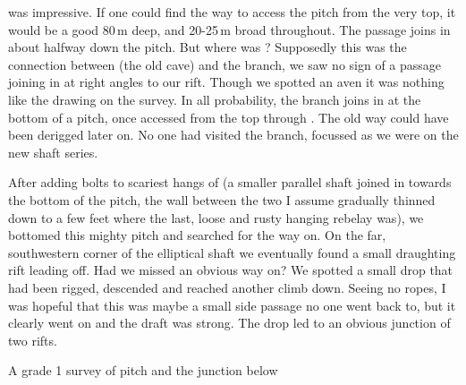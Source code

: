  was impressive. If one could find the way to access the pitch from the very top, it would be a good 80\,m deep, and 20-25\,m broad throughout. The passage joins in about halfway down the pitch. But where was ? Supposedly this was the connection between  (the old cave) and the  branch, we saw no sign of a passage joining in at right angles to our rift. Though we spotted an aven it was nothing like the drawing on the survey. In all probability, the  branch joins in at the bottom of a pitch, once accessed from the top through . The old way could have been derigged later on. No one had visited the  branch, focussed as we were on the new shaft series. 

After adding bolts to scariest hangs of  (a smaller parallel shaft joined in towards the bottom of the pitch, the wall between the two I assume gradually thinned down to a few feet where the last, loose and rusty hanging rebelay was), we bottomed this mighty pitch and searched for the way on. On the far, southwestern corner of the elliptical shaft  we eventually found a small draughting rift leading off. Had we missed an obvious way on? We spotted a small drop that had been rigged, descended and reached another climb down. Seeing no ropes, I was hopeful that this was maybe a small side passage no one went back to, but it clearly went on and the draft was strong. The drop led to an obvious junction of two rifts.

\begin{survey*}[t]
\checkoddpage \ifoddpage \forcerectofloat \else \forceversofloat \fi
\centering
{}
\caption[TTT pitch (grade 1)]{A grade 1 survey of \protect{} pitch and the \protect{} junction below }
\label{Grade 1 survey}
\end{survey*}



